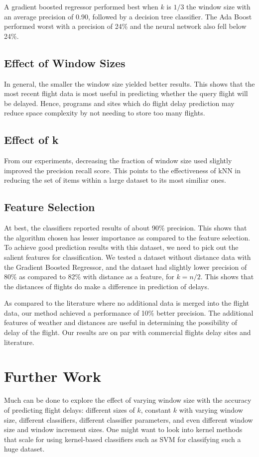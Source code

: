 \documentclass[letterpaper,11pt]{article}
\begin{document}
A gradient boosted regressor performed best when $k$ is $1/3$ the window size with an average precision of 0.90, followed by a decision tree classifier. The Ada Boost performed worst with a precision of 24\% and the neural network also fell below 24\%. 

\subsection{Effect of Window Sizes}
In general, the smaller the window size yielded better results. This shows that the most recent flight data is most useful in predicting whether the query flight will be delayed. Hence, programs and sites which do flight delay prediction may reduce space complexity by not needing to store too many flights. 

\subsection{Effect of k}
From our experiments, decreasing the fraction of window size used slightly improved the precision recall score. This points to the effectiveness of kNN in reducing the set of items within a large dataset to its most similiar ones.

\subsection{Feature Selection} 
At best, the classifiers reported results of about 90\% precision. This shows that the algorithm chosen has lesser importance as compared to the feature selection. To achieve good prediction results with this dataset, we need to pick out the salient features for classification. We tested a dataset without distance data with the Gradient Boosted Regressor, and the dataset had slightly lower precision of 80\% as compared to 82\% with distance as a feature, for $k=n/2$. This shows that the distances of flights do make a difference in prediction of delays. 

As compared to the literature where no additional data is merged into the flight data, our method achieved a performance of 10\% better precision. The additional features of weather and distances are useful in determining the possibility of delay of the flight. Our results are on par with commercial flights delay sites and literature. 

\section{Further Work}
Much can be done to explore the effect of varying window size with the accuracy of predicting flight delays: different sizes of $k$, constant $k$ with varying window size, different classifiers, different classifier parameters, and even different window size and window increment sizes. One might want to look into kernel methods that scale for using kernel-based classifiers such as SVM for classifying such a huge dataset. 
\end{document}
